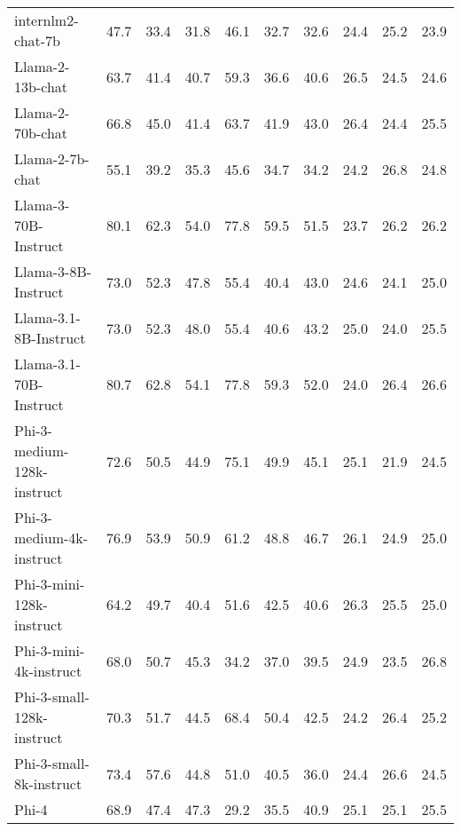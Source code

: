 \begin{table*}[]
\begin{tabular}{l|ccc|ccc|ccc}
         internlm2-chat-7b\cite{cai2024internlm2technicalreport} & 47.7 & 33.4 & 31.8 & 46.1 & 32.7 & 32.6 & 24.4 & 25.2 & 23.9 \\
         Llama-2-13b-chat\cite{touvron2023llama2openfoundation} & 63.7 & 41.4 & 40.7 & 59.3 & 36.6 & 40.6 & 26.5 & 24.5 & 24.6\\
         Llama-2-70b-chat\cite{touvron2023llama2openfoundation} & 66.8 & 45.0 & 41.4 & 63.7 & 41.9 & 43.0 & 26.4 & 24.4 & 25.5 \\
         Llama-2-7b-chat\cite{touvron2023llama2openfoundation} & 55.1 & 39.2 & 35.3 & 45.6 & 34.7 & 34.2 & 24.2 & 26.8 & 24.8\\
         Llama-3-70B-Instruct\cite{grattafiori2024llama3herdmodels} & 80.1 & 62.3 & 54.0 & 77.8 & 59.5 & 51.5 & 23.7 & 26.2 & 26.2 \\
         Llama-3-8B-Instruct\cite{grattafiori2024llama3herdmodels} & 73.0 & 52.3 & 47.8 & 55.4 & 40.4 & 43.0 & 24.6 & 24.1 & 25.0 \\
         Llama-3.1-8B-Instruct\cite{grattafiori2024llama3herdmodels} & 73.0 & 52.3 & 48.0 & 55.4 & 40.6 & 43.2 & 25.0 & 24.0 & 25.5 \\
         Llama-3.1-70B-Instruct\cite{grattafiori2024llama3herdmodels} & 80.7 & 62.8 & 54.1 & 77.8 & 59.3 & 52.0 & 24.0 & 26.4 & 26.6 \\
         Phi-3-medium-128k-instruct\cite{abdin2024phi3technicalreporthighly} & 72.6 & 50.5 & 44.9 & 75.1 & 49.9 & 45.1 & 25.1 & 21.9 & 24.5\\
         Phi-3-medium-4k-instruct\cite{abdin2024phi3technicalreporthighly} & 76.9 & 53.9 & 50.9 & 61.2 & 48.8 & 46.7 & 26.1 & 24.9 & 25.0 \\
         Phi-3-mini-128k-instruct\cite{abdin2024phi3technicalreporthighly} & 64.2 & 49.7 & 40.4 & 51.6 & 42.5 & 40.6 & 26.3 & 25.5 & 25.0 \\
         Phi-3-mini-4k-instruct\cite{abdin2024phi3technicalreporthighly}& 68.0 & 50.7 & 45.3 & 34.2 & 37.0 & 39.5 & 24.9 & 23.5 & 26.8 \\
         Phi-3-small-128k-instruct\cite{abdin2024phi3technicalreporthighly} & 70.3 & 51.7 & 44.5 & 68.4 & 50.4 & 42.5 & 24.2 & 26.4 & 25.2 \\
         Phi-3-small-8k-instruct\cite{abdin2024phi3technicalreporthighly} & 73.4 & 57.6 & 44.8 & 51.0 & 40.5 & 36.0 & 24.4 & 26.6 & 24.5\\
         Phi-4\cite{abdin2024phi4technicalreport} & 68.9 & 47.4 & 47.3 & 29.2 & 35.5 & 40.9 & 25.1 & 25.1 & 25.5\\

\end{tabular}
\end{table*}
